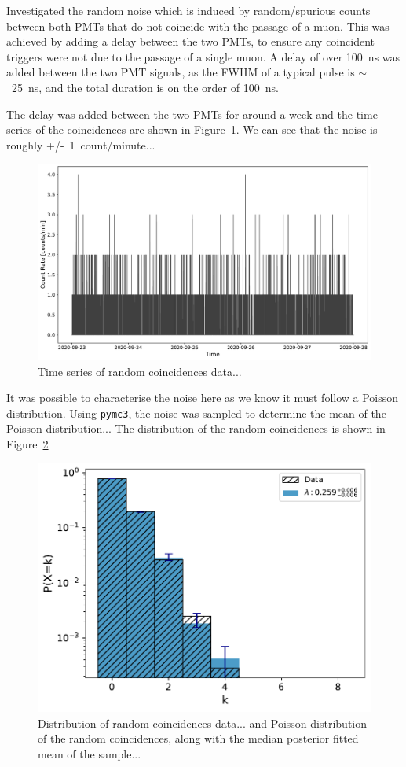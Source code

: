 Investigated the random noise which is induced by random/spurious counts between both PMTs that do not coincide with the passage of a muon. This was achieved by adding a delay between the two PMTs, to ensure any coincident triggers were not due to the passage of a single muon. A delay of over 100~ns was added between the two PMT signals, as the FWHM of a typical pulse is $\sim$~25~ns, and the total duration is on the order of 100~ns.

The delay was added between the two PMTs for around a week and the time series of the coincidences are shown in Figure~\ref{fig:random_coinciences}. We can see that the noise is roughly +/-~1~count/minute...

\begin{figure}[ht!]
	\centering
	\includegraphics[width=0.6\columnwidth]{random_noise_timeseries.pdf}
	\caption{Time series of random coincidences data...}
	\label{fig:random_coinciences}
\end{figure}

It was possible to characterise the noise here as we know it must follow a Poisson distribution. Using \verb|pymc3|, the noise was sampled to determine the mean of the Poisson distribution... The distribution of the random coincidences is shown in Figure~\ref{fig:random_coinciences_dist}

\begin{figure}[ht!]
	\centering
	\includegraphics[width=0.6\columnwidth]{random_noise_fitted_poisson.pdf}
	\caption{Distribution of random coincidences data... and Poisson distribution of the random coincidences, along with the median posterior fitted mean of the sample...}
	\label{fig:random_coinciences_dist}
\end{figure}

